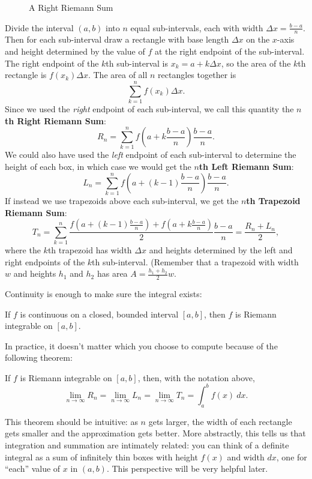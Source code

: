 \begin{figure}[h!]
\begin{tikzpicture}[x=0.75pt,y=0.75pt,yscale=-1,xscale=1]
\end{tikzpicture}
\caption{A Right Riemann Sum}
\end{figure}

Divide the interval $(a,b)$ into $n$ equal sub-intervals, each with width $\Delta x= \frac{b-a}{n}$. Then for each sub-interval draw a rectangle with base length $\Delta x$ on the $x$-axis and height determined by the value of $f$ at the right endpoint of the sub-interval. The right endpoint of the $k$th sub-interval is $x_k=a+k\Delta x$, so the area of the $k$th rectangle is $f(x_k) \Delta x$. The area of all $n$ rectangles together is
$$\sum_{k=1}^{n}f(x_k)\Delta x.$$
Since we used the \textit{right} endpoint of each sub-interval, we call this quantity the \textbf{$n$th Right Riemann Sum}:
$$R_n=\sum_{k=1}^{n}f\left(a+k\frac{b-a}{n}\right)\frac{b-a}{n}.$$
We could also have used the \textit{left} endpoint of each sub-interval to determine the height of each box, in which case we would get the \textbf{$n$th Left Riemann Sum}:
$$L_n=\sum_{k=1}^{n}f\left(a+(k-1)\frac{b-a}{n}\right)\frac{b-a}{n}.$$
If instead we use trapezoids above each sub-interval, we get the \textbf{$n$th Trapezoid Riemann Sum}: 
$$T_n=\sum_{k=1}^{n}\frac{f\left(a+(k-1)\frac{b-a}{n}\right)+f\left(a+k\frac{b-a}{n}\right)}{2}\frac{b-a}{n}=\frac{R_n+L_n}{2},$$
where the $k$th trapezoid has width $\Delta x$ and heights determined by the left and right endpoints of the $k$th sub-interval. (Remember that a trapezoid with width $w$ and heights $h_1$ and $h_2$ has area $A=\frac{h_1+h_2}{2}w$. 

Continuity is enough to make sure the integral exists:
\begin{thm}
If $f$ is continuous on a closed, bounded interval $[a,b]$, then $f$ is
Riemann integrable on $[a,b]$.
\end{thm}

In practice, it doesn't matter which you choose to compute because of the following theorem:
\begin{thm}
 If $f$ is Riemann integrable on $[a,b]$, then, with the notation above,
$$\lim_{n\to\infty}R_n=\lim_{n\to\infty}L_n=\lim_{n\to\infty}T_n=\int_a^bf(x)\ dx.$$
\end{thm}

This theorem should be intuitive: as $n$ gets larger, the width of each rectangle gets smaller and the approximation gets better. More abstractly, this tells us that integration and summation are intimately related: you can think of a definite integral as a sum of infinitely thin boxes with height $f(x)$ and width $dx$, one for ``each'' value of $x$ in $(a,b)$. This perspective will be very helpful later. 

